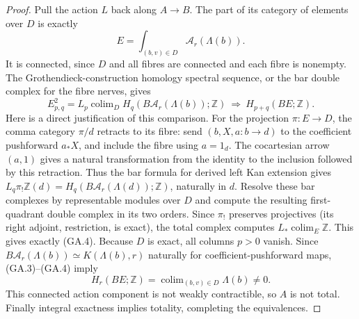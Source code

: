 \begin{proof}
Pull the action $L$ back along $A\to B$. The part of its
category of elements over $D$ is exactly
\[
 E=\int_{(b,v)\in D}\mathcal A_r(\Lambda(b)).
\]
It is connected, since $D$ and all fibres are connected and
each fibre is nonempty. The Grothendieck-construction homology
spectral sequence, or the bar double complex for the fibre
nerves, gives
\[
 E^2_{p,q}=L_p\operatorname{colim}_{D}
 H_q(B\mathcal A_r(\Lambda(b));\mathbb Z)
 \ \Longrightarrow\ H_{p+q}(BE;\mathbb Z).
 \tag{GA.4}
\]
Here is a direct justification of this comparison. For the projection
$\pi:E\to D$, the comma category $\pi/d$ retracts to its fibre:
send $(b,X,a:b\to d)$ to the coefficient pushforward $a_*X$,
and include the fibre using $a=1_d$. The cocartesian arrow
$(a,1)$ gives a natural transformation from the identity to the
inclusion followed by this retraction. Thus the bar formula for
derived left Kan extension gives
$L_q\pi_!\mathbb Z(d)=H_q(B\mathcal A_r(\Lambda(d));\mathbb Z)$,
naturally in $d$. Resolve these bar complexes by representable
modules over $D$ and compute the resulting first-quadrant double
complex in its two orders. Since $\pi_!$ preserves projectives
(its right adjoint, restriction, is exact), the total complex computes
$L_*\operatorname{colim}_E\mathbb Z$. This gives exactly (GA.4).
Because $D$ is exact, all columns $p>0$ vanish. Since
$B\mathcal A_r(\Lambda(b))\simeq K(\Lambda(b),r)$ naturally for
coefficient-pushforward maps, (GA.3)--(GA.4) imply
\[
 H_r(BE;\mathbb Z)=
 \operatorname{colim}_{(b,v)\in D}\Lambda(b)\ne0.
\]
This connected action component is not weakly contractible,
so $A$ is not total. Finally integral exactness implies
totality, completing the equivalences.
\end{proof}
